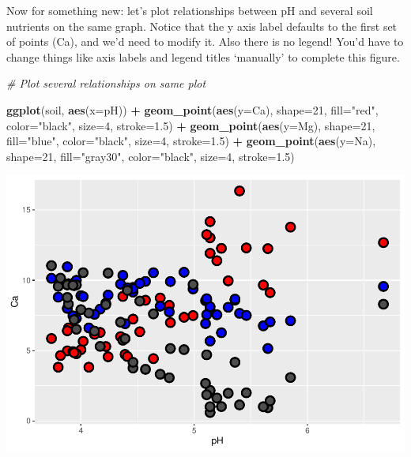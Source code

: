 \documentclass[
]{article}
\newenvironment{Shaded}{\begin{snugshade}}{\end{snugshade}}
\newcommand{\AttributeTok}[1]{\textcolor[rgb]{0.13,0.29,0.53}{#1}}
\newcommand{\CommentTok}[1]{\textcolor[rgb]{0.56,0.35,0.01}{\textit{#1}}}
\newcommand{\DecValTok}[1]{\textcolor[rgb]{0.00,0.00,0.81}{#1}}
\newcommand{\FloatTok}[1]{\textcolor[rgb]{0.00,0.00,0.81}{#1}}
\newcommand{\FunctionTok}[1]{\textcolor[rgb]{0.13,0.29,0.53}{\textbf{#1}}}
\newcommand{\NormalTok}[1]{#1}
\newcommand{\SpecialCharTok}[1]{\textcolor[rgb]{0.81,0.36,0.00}{\textbf{#1}}}
\newcommand{\StringTok}[1]{\textcolor[rgb]{0.31,0.60,0.02}{#1}}
\begin{document}
Now for something new: let's plot relationships between pH and several
soil nutrients on the same graph. Notice that the y axis label defaults
to the first set of points (Ca), and we'd need to modify it. Also there
is no legend! You'd have to change things like axis labels and legend
titles `manually' to complete this figure.

\begin{Shaded}
\begin{Highlighting}[]
\CommentTok{\# Plot several relationships on same plot}

\FunctionTok{ggplot}\NormalTok{(soil, }\FunctionTok{aes}\NormalTok{(}\AttributeTok{x=}\NormalTok{pH)) }\SpecialCharTok{+}
  \FunctionTok{geom\_point}\NormalTok{(}\FunctionTok{aes}\NormalTok{(}\AttributeTok{y=}\NormalTok{Ca), }\AttributeTok{shape=}\DecValTok{21}\NormalTok{, }\AttributeTok{fill=}\StringTok{"red"}\NormalTok{, }\AttributeTok{color=}\StringTok{"black"}\NormalTok{, }\AttributeTok{size=}\DecValTok{4}\NormalTok{, }\AttributeTok{stroke=}\FloatTok{1.5}\NormalTok{) }\SpecialCharTok{+}
  \FunctionTok{geom\_point}\NormalTok{(}\FunctionTok{aes}\NormalTok{(}\AttributeTok{y=}\NormalTok{Mg), }\AttributeTok{shape=}\DecValTok{21}\NormalTok{, }\AttributeTok{fill=}\StringTok{"blue"}\NormalTok{, }\AttributeTok{color=}\StringTok{"black"}\NormalTok{, }\AttributeTok{size=}\DecValTok{4}\NormalTok{, }\AttributeTok{stroke=}\FloatTok{1.5}\NormalTok{) }\SpecialCharTok{+}
  \FunctionTok{geom\_point}\NormalTok{(}\FunctionTok{aes}\NormalTok{(}\AttributeTok{y=}\NormalTok{Na), }\AttributeTok{shape=}\DecValTok{21}\NormalTok{, }\AttributeTok{fill=}\StringTok{"gray30"}\NormalTok{, }\AttributeTok{color=}\StringTok{"black"}\NormalTok{, }\AttributeTok{size=}\DecValTok{4}\NormalTok{, }\AttributeTok{stroke=}\FloatTok{1.5}\NormalTok{)}
\end{Highlighting}
\end{Shaded}

\includegraphics{module1_3_files/figure-latex/unnamed-chunk-28-1.pdf}
\end{document}
